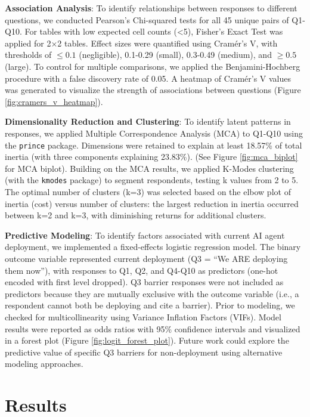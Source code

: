 \documentclass{article}
\begin{document}
\textbf{Association Analysis}: To identify relationships between
responses to different questions, we conducted Pearson's Chi-squared
tests for all 45 unique pairs of Q1-Q10. For tables with low expected cell
counts (\textless5), Fisher's Exact Test was applied for 2×2 tables.
Effect sizes were quantified using Cramér's V, with thresholds of
$\leq 0.1$ (negligible), 0.1-0.29 (small), 0.3-0.49 (medium), and $\geq 0.5$ (large). To control for multiple comparisons, we applied the
Benjamini-Hochberg procedure with a false discovery rate of 0.05. A
heatmap of Cramér's V values was generated to visualize the strength of
associations between questions (Figure \ref{fig:cramers_v_heatmap}).

\textbf{Dimensionality Reduction and Clustering}: To identify latent
patterns in responses, we applied Multiple Correspondence Analysis (MCA)
to Q1-Q10 using the \texttt{prince} package. Dimensions were retained to
explain at least 18.57\% of total inertia (with three components explaining 23.83\%). (See Figure \ref{fig:mca_biplot} for MCA biplot). Building on the MCA results, we
applied K-Modes clustering (with the \texttt{kmodes} package) to segment
respondents, testing k values from 2 to 5. The optimal number of
clusters (k=3) was selected based on the elbow plot of inertia (cost)
versus number of clusters: the largest reduction in inertia occurred
between k=2 and k=3, with diminishing returns for additional clusters.

\textbf{Predictive Modeling}: To identify factors associated with
current AI agent deployment, we implemented a fixed-effects logistic
regression model. The binary
outcome variable represented current deployment (Q3 = ``We ARE deploying
them now''), with responses to Q1, Q2, and Q4-Q10 as predictors (one-hot
encoded with first level dropped). Q3 barrier responses were not
included as predictors because they are mutually exclusive with the
outcome variable (i.e., a respondent cannot both be deploying and cite a
barrier). Prior to modeling, we checked for multicollinearity using
Variance Inflation Factors (VIFs). Model results were reported as odds
ratios with 95\% confidence intervals and visualized in a forest plot (Figure \ref{fig:logit_forest_plot}).
Future work could explore the predictive value of specific Q3 barriers
for non-deployment using alternative modeling approaches.

\section{Results}\label{results}
\end{document}
